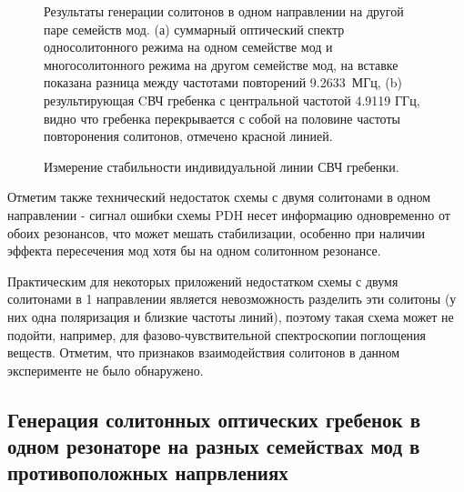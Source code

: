 \begin{figure}[ht]
\begin{minipage}[ht]{1\linewidth}
\end{minipage}
\caption{Результаты генерации солитонов в одном направлении на другой паре семейств мод. (а) суммарный оптический спектр односолитонного режима на одном семействе мод и многосолитонного режима на другом семействе мод, на вставке показана разница между частотами повторений 9.2633~МГц, (b) результирующая CВЧ гребенка с центральной частотой 4.9119 ГГц, видно что гребенка перекрывается с собой на половине частоты повторонения солитонов, отмечено красной линией.}
\label{coscheme_different_types}
\end{figure}

\begin{figure}[ht]
\begin{minipage}[ht]{1\linewidth}
\end{minipage}
\caption{Измерение стабильности индивидуальной линии СВЧ гребенки.}
\label{single_line_stability_cp}
\end{figure}

Отметим также технический недостаток схемы с двумя солитонами в одном направлении - сигнал ошибки схемы PDH несет информацию одновременно от обоих резонансов, что может мешать стабилизации, особенно при наличии эффекта пересечения мод хотя бы на одном солитонном резонансе.

Практическим для некоторых приложений недостатком схемы с двумя солитонами в 1 направлении является невозможность разделить эти солитоны (у них одна поляризация и близкие частоты линий), поэтому такая схема может не подойти, например, для фазово-чувствительной спектроскопии поглощения веществ. Отметим, что признаков взаимодействия солитонов в данном эксперименте не было обнаружено.

\subsection{Генерация солитонных оптических гребенок в одном резонаторе на разных семействах мод в противоположных напрвлениях}

